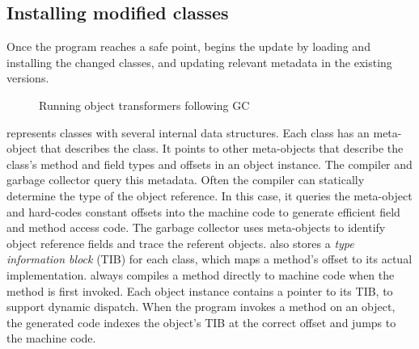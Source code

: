 \subsection{Installing modified classes}
\label{sec:loading}

Once the program reaches a safe point, \DSU{} begins the update by
loading and installing the changed classes, and updating relevant
metadata in the existing versions.

\begin{figure}[t]
% 
\begin{center}
% 
\end{center}
\caption{Running object transformers following GC}
\label{fig:gc-example}
\end{figure}

\JikesRVM{} represents  classes with several internal data structures.
Each class has an \VMClass{} meta-object that describes
the class.  It points to other meta-objects that describe the class's
method and field types and offsets in an object instance.  
The compiler and garbage collector query this metadata.  Often the
compiler can statically determine the type of the object reference. In
this case, it queries the meta-object and hard-codes constant offsets
into the machine code to generate efficient field and method access
code.
The garbage collector uses meta-objects to identify object reference fields and
trace the referent objects.
\VMClass{} also stores a \emph{type information block} (TIB) for each
class, which maps a method's offset to its actual implementation.
\JikesRVM{} always compiles a method directly to machine
code when the method is first invoked.  Each object instance
contains a pointer to its TIB, to support dynamic dispatch.  When the
program invokes a method on an object, the generated code
indexes the object's TIB at the correct offset and jumps to the
machine code.

